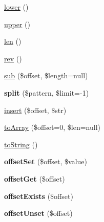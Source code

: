\begin{DoxyCompactItemize}
\item 
\hyperlink{classString_a70de74664e69b6e2fc93d231173df0d2}{lower} ()
\item 
\hyperlink{classString_a07d720a3ea80bbc85f7424d2d7c27701}{upper} ()
\item 
\hyperlink{classString_afa58fa9927bc0240baf185917c849245}{len} ()
\item 
\hyperlink{classString_a47b2739889b38abb582c4eee7d010f91}{rev} ()
\item 
\hyperlink{classString_a23eb86e0ad225b29dd3e02e637a42c37}{sub} (\$offset, \$length=null)
\item 
\hypertarget{classString_af1ceaa53461e40a69de4f14a115d7d56}{
{\bfseries split} (\$pattern, \$limit=-\/1)}
\label{classString_af1ceaa53461e40a69de4f14a115d7d56}

\item 
\hyperlink{classString_abe7d7e1e2b57ab7dcd01d8e2d1d53148}{insert} (\$offset, \$str)
\item 
\hyperlink{classString_abacf7b1614b42312f4f49ca064980139}{toArray} (\$offset=0, \$len=null)
\item 
\hyperlink{classString_aa7ef98a0c1a4b8b375baf8791e7b773c}{toString} ()
\item 
\hypertarget{classString_a6a17056cddb17560a093b846c6168537}{
{\bfseries offsetSet} (\$offset, \$value)}
\label{classString_a6a17056cddb17560a093b846c6168537}

\item 
\hypertarget{classString_a4627964e8bc80f485b4b7c1b1c609820}{
{\bfseries offsetGet} (\$offset)}
\label{classString_a4627964e8bc80f485b4b7c1b1c609820}

\item 
\hypertarget{classString_a0ad487f2acca3753cd9d42cf9325225e}{
{\bfseries offsetExists} (\$offset)}
\label{classString_a0ad487f2acca3753cd9d42cf9325225e}

\item 
\hypertarget{classString_af12691beca61c36ac057a8515b2f4bfe}{
{\bfseries offsetUnset} (\$offset)}
\label{classString_af12691beca61c36ac057a8515b2f4bfe}

\end{DoxyCompactItemize}


